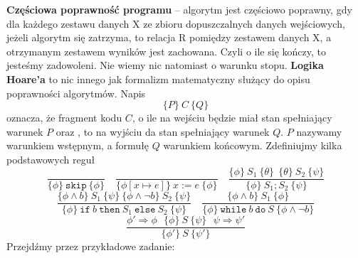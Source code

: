 \textbf{Częściowa poprawność programu} -- 
algorytm jest częściowo poprawny, gdy dla każdego zestawu danych X ze zbioru dopuszczalnych danych wejściowych, jeżeli algorytm się zatrzyma, to relacja R pomiędzy zestawem danych X, a otrzymanym zestawem wyników jest zachowana. Czyli o ile się kończy, to jesteśmy zadowoleni. Nie wiemy nic natomiast o warunku stopu. \newline
\textbf{Logika Hoare'a} to nic innego jak formalizm matematyczny służący do opisu poprawności algorytmów. Napis
$$
\{P\} \ C \ \{Q\}
$$
oznacza, że fragment kodu $C$, o ile na wejściu będzie miał stan spełniający warunek $P$ oraz , to na wyjściu da stan spełniający warunek $Q$. $P$ nazywamy warunkiem wstępnym, a formułę $Q$ warunkiem końcowym.
Zdefiniujmy kilka podstawowych reguł
$$
\frac{}{\{\phi\}\ \texttt{skip}\ \{\phi\}} \quad \frac{}{\{\phi[x \mapsto e ] \}\ x := e\ \{\phi\}} \quad \frac{\{\phi\}\ S_1\ \{\theta\} \ \ \{\theta\}\ S_2\ \{\psi\}}{\{\phi\}\ S_1;S_2\ \{\psi\}}
$$
$$
\frac{\{\phi \land b\}\ S_1\ \{\psi\} \ \{\phi \land \neg b\}\ S_2\ \{\psi\}}{\{\phi\}\ \texttt{if} \ b \ \texttt{then} \ S_1 \ \texttt{else} \ S_2\ \{\psi\}} \quad \frac{\{\phi \land b \}\ S_1\ \{\phi\}}{\{\phi\}\ \texttt{while} \ b \ \texttt{do} \ S\ \{\phi \land \neg b\}}
$$
$$
\frac{\phi' \Longrightarrow \phi \ \ \ \{\phi\}\ S\ \{\psi\} \ \ \ \psi \Longrightarrow \psi'}{\{\phi'\}\ S\ \{\psi'\}}
$$
Przejdźmy przez przykładowe zadanie:
